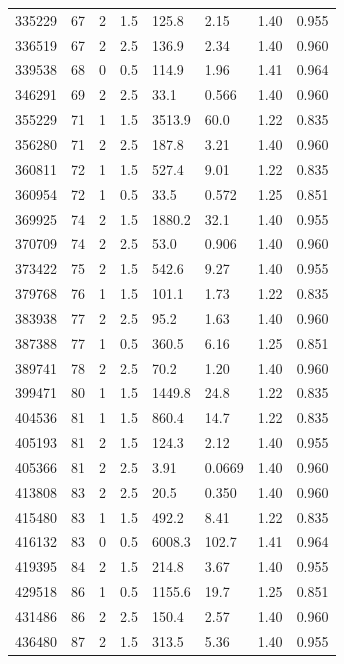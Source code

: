 \documentclass[preview]{standalone}
\begin{document}
{{{\begin{tabular}{L{1.2cm}C{1.2cm} C{0.3cm}C{0.5cm} C{1.4cm}C{1.4cm} C{1.4cm}C{1.4cm}}
  335229  &    67  & 2     & 1.5 &  125.8  & 2.15  & 1.40 &  0.955   \\ 
  336519  &    67  & 2     & 2.5 &  136.9  & 2.34  & 1.40 &  0.960   \\ 
  339538  &    68  & 0     & 0.5 &  114.9  & 1.96  & 1.41 &  0.964   \\ 
  346291  &    69  & 2     & 2.5 &  33.1  & 0.566  & 1.40 &  0.960   \\ 
  355229  &    71  & 1     & 1.5 &  3513.9  & 60.0  & 1.22 &  0.835   \\ 
  356280  &    71  & 2     & 2.5 &  187.8  & 3.21  & 1.40 &  0.960   \\ 
  360811  &    72  & 1     & 1.5 &  527.4  & 9.01  & 1.22 &  0.835   \\ 
  360954  &    72  & 1     & 0.5 &  33.5  & 0.572  & 1.25 &  0.851   \\ 
  369925  &    74  & 2     & 1.5 &  1880.2  & 32.1  & 1.40 &  0.955   \\ 
  370709  &    74  & 2     & 2.5 &  53.0  & 0.906  & 1.40 &  0.960   \\ 
  373422  &    75  & 2     & 1.5 &  542.6  & 9.27  & 1.40 &  0.955   \\ 
  379768  &    76  & 1     & 1.5 &  101.1  & 1.73  & 1.22 &  0.835   \\ 
  383938  &    77  & 2     & 2.5 &  95.2  & 1.63  & 1.40 &  0.960   \\ 
  387388  &    77  & 1     & 0.5 &  360.5  & 6.16  & 1.25 &  0.851   \\ 
  389741  &    78  & 2     & 2.5 &  70.2  & 1.20  & 1.40 &  0.960   \\ 
  399471  &    80  & 1     & 1.5 &  1449.8  & 24.8  & 1.22 &  0.835   \\ 
  404536  &    81  & 1     & 1.5 &  860.4  & 14.7  & 1.22 &  0.835   \\ 
  405193  &    81  & 2     & 1.5 &  124.3  & 2.12  & 1.40 &  0.955   \\ 
  405366  &    81  & 2     & 2.5 &  3.91  & 0.0669  & 1.40 &  0.960   \\ 
  413808  &    83  & 2     & 2.5 &  20.5  & 0.350  & 1.40 &  0.960   \\ 
  415480  &    83  & 1     & 1.5 &  492.2  & 8.41  & 1.22 &  0.835   \\ 
  416132  &    83  & 0     & 0.5 &  6008.3  & 102.7  & 1.41 &  0.964   \\ 
  419395  &    84  & 2     & 1.5 &  214.8  & 3.67  & 1.40 &  0.955   \\ 
  429518  &    86  & 1     & 0.5 &  1155.6  & 19.7  & 1.25 &  0.851   \\ 
  431486  &    86  & 2     & 2.5 &  150.4  & 2.57  & 1.40 &  0.960   \\ 
  436480  &    87  & 2     & 1.5 &  313.5  & 5.36  & 1.40 &  0.955   \\ 
\hline 
\end{tabular} 

}}}
\end{document}
